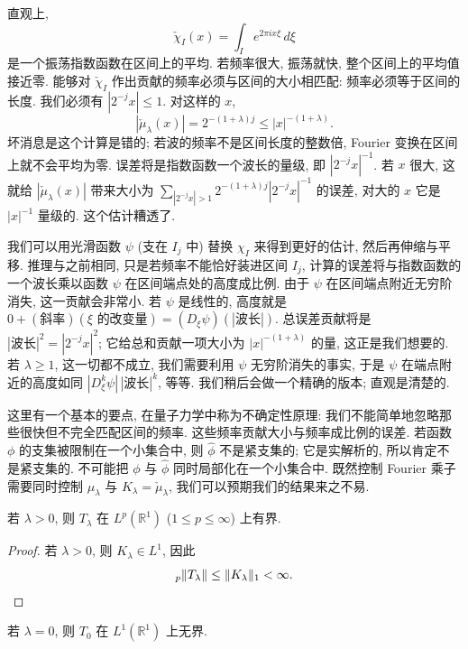 直观上,
\[
\check{\chi}_{I}(x)=\int_{I}e^{2\pi ix\xi}\,d\xi
\]
是一个振荡指数函数在区间上的平均. 若频率很大, 振荡就快, 整个区间上的平均值接近零. 能够对 $\check{\chi}_I$ 作出贡献的频率必须与区间的大小相匹配: 频率必须等于区间的长度. 我们必须有 $|2^{-j}x|\leq 1$. 对这样的 $x$,
\[
|\check{\mu}_{\lambda}(x)|=2^{-(1+\lambda)j}\leq|x|^{-(1+\lambda)}.
\]
坏消息是这个计算是错的; 若波的频率不是区间长度的整数倍, Fourier 变换在区间上就不会平均为零. 误差将是指数函数一个波长的量级, 即 $|2^{-j}x|^{-1}$. 若 $x$ 很大, 这就给 $|\check{\mu}_\lambda(x)|$ 带来大小为 $\sum_{|2^{-j}x|>1}2^{-(1+\lambda)j}|2^{-j}x|^{-1}$ 的误差, 对大的 $x$ 它是 $|x|^{-1}$ 量级的. 这个估计糟透了.

我们可以用光滑函数 $\psi$ (支在 $I_j$ 中) 替换 $\chi_I$ 来得到更好的估计, 然后再伸缩与平移. 推理与之前相同, 只是若频率不能恰好装进区间 $I_j$, 计算的误差将与指数函数的一个波长乘以函数 $\psi$ 在区间端点处的高度成比例. 由于 $\psi$ 在区间端点附近无穷阶消失, 这一贡献会非常小. 若 $\psi$ 是线性的, 高度就是 $0+(\text{斜率})(\xi \text{ 的改变量})=(D_\xi\psi)(|\text{波长}|)$. 总误差贡献将是 $|\text{波长}|^2=|2^{-j}x|^2$; 它给总和贡献一项大小为 $|x|^{-(1+\lambda)}$ 的量, 这正是我们想要的. 若 $\lambda\geq 1$, 这一切都不成立, 我们需要利用 $\psi$ 无穷阶消失的事实, 于是 $\psi$ 在端点附近的高度如同 $|D_\xi^k\psi|\,|\text{波长}|^k$, 等等. 我们稍后会做一个精确的版本; 直观是清楚的.

这里有一个基本的要点, 在量子力学中称为不确定性原理: 我们不能简单地忽略那些很快但不完全匹配区间的频率. 这些频率贡献大小与频率成比例的误差. 若函数 $\phi$ 的支集被限制在一个小集合中, 则 $\hat{\phi}$ 不是紧支集的; 它是实解析的, 所以肯定不是紧支集的. 不可能把 $\phi$ 与 $\hat{\phi}$ 同时局部化在一个小集合中. 既然控制 Fourier 乘子需要同时控制 $\mu_{\lambda}$ 与 $K_{\lambda}=\check{\mu}_{\lambda}$, 我们可以预期我们的结果来之不易.

\begin{corollary}\label{cor:2.8}
若 $\lambda>0$, 则 $T_\lambda$ 在 $L^p(\mathbb{R}^1)$ ($1\leq p\leq\infty$) 上有界.
\end{corollary}

\begin{proof}
若 $\lambda>0$, 则 $K_\lambda\in L^1$, 因此
\[
{}_{p}\|T_{\lambda}\|\leq\|K_{\lambda}\|_{1}<\infty. \qedhere
\]
\end{proof}

\begin{lemma}\label{lem:2.9}
若 $\lambda=0$, 则 $T_0$ 在 $L^1(\mathbb{R}^1)$ 上无界.
\end{lemma}


